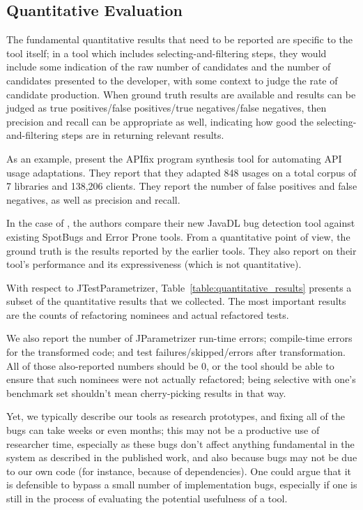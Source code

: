 \subsection{Quantitative Evaluation}
The fundamental quantitative results that need to be reported are
specific to the tool itself; in a tool which includes selecting-and-filtering
steps, they would include some indication of the raw number of candidates
and the number of candidates presented to the developer, with some 
context to judge the rate of candidate production. When ground truth 
results are available and results can be judged as true positives/false positives/true negatives/false negatives,
then precision and recall can be appropriate as well, indicating how good
the selecting-and-filtering steps are in returning relevant results.

As an example,  present the {\sc APIfix} program synthesis tool for automating API usage adaptations. They report that they adapted 848 usages on a total corpus of 7 libraries and 138,206 clients. They report the number of false positives and false negatives, as well as precision and recall.

In the case of \cite{dura21:_javad}, the authors compare their new {\sc JavaDL} bug detection tool against existing SpotBugs and Error Prone tools. From a quantitative point of view, the ground truth is the results reported by the earlier tools. They also report on their tool's performance and its expressiveness (which is not quantitative).

With respect to JTestParametrizer,
Table~\ref{table:quantitative_results} presents a subset of the
quantitative results that we collected. The most important results are
the counts of refactoring nominees and actual refactored tests. 

We
also report the number of JParametrizer run-time errors; compile-time
errors for the transformed code; and test failures/skipped/errors
after transformation. All of those also-reported numbers should be 0, or the tool should be
able to ensure that such nominees were not actually refactored; being
selective with one's benchmark set shouldn't mean cherry-picking
results in that way. 

Yet, we typically describe our tools as research
prototypes, and fixing all of the bugs can take weeks or even months;
this may not be a productive use of researcher time, especially as
these bugs don't affect anything fundamental in the system as
described in the published work, and also because bugs may not be due
to our own code (for instance, because of dependencies).  One could
argue that it is defensible to bypass a small number of implementation
bugs, especially if one is still in the process of evaluating
the potential usefulness of a tool.

